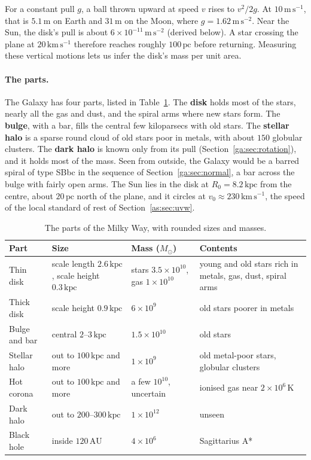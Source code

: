 For a constant pull $g$, a ball thrown upward at speed $v$ rises to $v^2/2g$. At $10\,\mathrm{m\,s^{-1}}$, that is $5.1\,\mathrm m$ on Earth and $31\,\mathrm m$ on the Moon, where $g=1.62\,\mathrm{m\,s^{-2}}$. Near the Sun, the disk's pull is about $6\times10^{-11}\,\mathrm{m\,s^{-2}}$ (derived below). A star crossing the plane at $20\,\mathrm{km\,s^{-1}}$ therefore reaches roughly $100\,\mathrm{pc}$ before returning. Measuring these vertical motions lets us infer the disk's mass per unit area.

\paragraph{The parts.} The Galaxy has four parts, listed in Table~\ref{ga:tab:galaxy}. The \textbf{disk} holds most of the stars, nearly all the gas and dust, and the spiral arms where new stars form. The \textbf{bulge}, with a bar, fills the central few kiloparsecs with old stars. The \textbf{stellar halo} is a sparse round cloud of old stars poor in metals, with about $150$ globular clusters. The \textbf{dark halo} is known only from its pull (Section~\ref{ga:sec:rotation}), and it holds most of the mass. Seen from outside, the Galaxy would be a barred spiral of type SBbc in the sequence of Section~\ref{ga:sec:normal}, a bar across the bulge with fairly open arms. The Sun lies in the disk at $R_0=8.2\,\mathrm{kpc}$ from the centre, about $20\,\mathrm{pc}$ north of the plane, and it circles at $v_0\approx230\,\mathrm{km\,s^{-1}}$, the speed of the local standard of rest of Section~\ref{as:sec:uvw}.

\begin{table}[htbp]
	\centering
	\begin{tabular}{@{}l p{} p{} p{}@{}}
		\toprule
		\textbf{Part} & \textbf{Size} & \textbf{Mass} ($M_\odot$) & \textbf{Contents} \\
		\midrule
		Thin disk & scale length $2.6\,\mathrm{kpc}$, scale height $0.3\,\mathrm{kpc}$ & stars $3.5\times10^{10}$, gas $1\times10^{10}$ & young and old stars rich in metals, gas, dust, spiral arms \\
		Thick disk & scale height $0.9\,\mathrm{kpc}$ & $6\times10^{9}$ & old stars poorer in metals \\
		Bulge and bar & central $2$--$3\,\mathrm{kpc}$ & $1.5\times10^{10}$ & old stars \\
		Stellar halo & out to $100\,\mathrm{kpc}$ and more & $1\times10^{9}$ & old metal-poor stars, globular clusters \\
		Hot corona & out to $100\,\mathrm{kpc}$ and more & a few $10^{10}$, uncertain & ionised gas near $2\times10^6\,\mathrm K$ \\
		Dark halo & out to $200$--$300\,\mathrm{kpc}$ & $1\times10^{12}$ & unseen \\
		Black hole & inside $120\,\mathrm{AU}$ & $4\times10^{6}$ & Sagittarius A* \\
		\bottomrule
	\end{tabular}
	\caption{The parts of the Milky Way, with rounded sizes and masses.}
	\label{ga:tab:galaxy}
\end{table}

